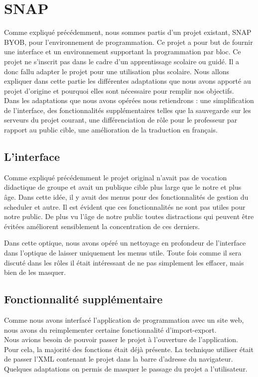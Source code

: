 \section{SNAP}
Comme expliqué précédemment, nous sommes partis d'un projet existant, SNAP BYOB, pour l'environnement de programmation. Ce projet a pour but de fournir une interface et un environnement supportant la programmation par bloc. Ce projet ne s'inscrit pas dans le cadre d'un apprentissage scolaire ou guidé. Il a donc fallu adapter le projet pour une utilisation plus scolaire. Nous allons expliquer dans cette partie les différentes adaptations que nous avons apporté au projet d'origine et pourquoi elles sont nécessaire pour remplir nos objectifs.\\

Dans les adaptations que nous avons opérées nous retiendrons : une simplification de l'interface, des fonctionnalités supplémentaires telles que la sauvegarde sur les serveurs du projet courant, une différenciation de rôle pour le professeur par rapport au public cible, une amélioration de la traduction en français.

\subsection{L'interface}
Comme expliqué précédemment le projet original n'avait pas de vocation didactique de groupe et avait un publique cible plus large que le notre et plus âge. Dans cette idée, il y avait des menus pour des fonctionnalités de gestion du scheduler et autre. Il est évident que ces fonctionnalités ne sont pas utiles pour notre public. De plus vu l'âge de notre public toutes distractions qui peuvent être évitées améliorent sensiblement la concentration de ces derniers.

Dans cette optique, nous avons opéré un nettoyage en profondeur de l'interface dans l'optique de laisser uniquement les menus utile. Toute fois comme il sera discuté dans les rôles il était intéressant de ne pas simplement les effacer, mais bien de les masquer.

\subsection{Fonctionnalité supplémentaire}
Comme nous avons interfacé l'application de programmation avec un site web, nous avons du reimplementer certaine fonctionnalité d'import-export.\\

Nous avions besoin de pouvoir passer le projet à l'ouverture de l'application. Pour cela, la majorité des fonctions était déjà présente. La technique utiliser était de passer l'XML contenant le projet dans la barre d'adresse du navigateur. Quelques adaptations on permis de masquer le passage du projet a l'utilisateur.\\

